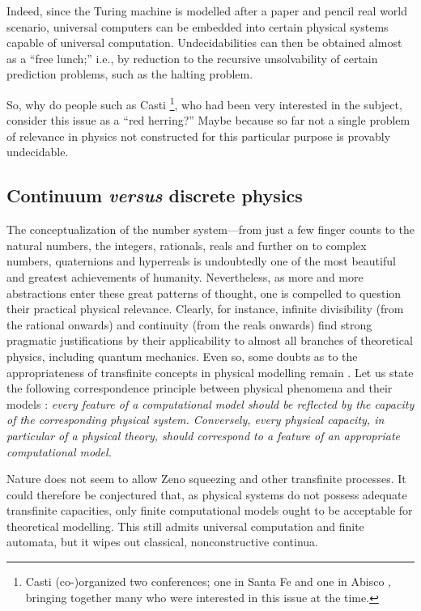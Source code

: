 \documentclass[pre,preprint,showpacs,showkeys,amsfonts]{revtex4}
\begin{document}
Indeed, since the Turing machine is modelled after a paper and pencil real world scenario,
universal computers can be embedded into certain physical
systems capable of universal computation.
Undecidabilities can then be obtained almost as a ``free lunch;''
i.e.,  by reduction to the recursive unsolvability
of certain prediction problems, such as the halting problem.

So, why do people such as Casti
\footnote{
Casti (co-)organized two conferences; one in Santa Fe \cite{casti:94-onlimits}
and one in Abisco  \cite{casti:96-onlimits},
bringing together many who were interested in this issue at the time.
}, who had  been very interested
in the subject, consider this issue as a ``red herring?''
Maybe because so far not a single problem of
relevance in physics not constructed for this particular purpose
is provably undecidable.

\subsection{Continuum {\it versus} discrete physics}

The conceptualization of the number
system---from just a few finger counts to the natural numbers,
the integers, rationals,
reals \cite{drobot} and further on to complex numbers, quaternions and hyperreals
is undoubtedly one of the most beautiful and greatest achievements of humanity.
Nevertheless, as more and more abstractions enter these great patterns of thought,
one is compelled to question
their practical physical relevance.
Clearly, for instance, infinite divisibility (from the rational onwards)
and continuity (from the reals onwards)
find strong pragmatic justifications by their
applicability to almost all branches of theoretical physics,
including quantum mechanics.
Even so,  some doubts as to the appropriateness
of transfinite concepts in physical modelling
remain \cite{bridgman}.
Let us state the following correspondence principle
between physical phenomena and their models \cite{svozil-set}:
{\em every feature of a computational model should be reflected by the
capacity of the corresponding physical system.
Conversely, every physical capacity, in particular of a physical theory,
should correspond to a feature of an appropriate
computational model.}

Nature does not seem to allow Zeno squeezing
\cite{weyl:49,gruenbaum:74,thom:54,benna:62,pit:90,hogarth1,ear-nor:93,svozil-93,sv-aut-rev}
and other transfinite processes.
It could therefore be conjectured that, as
physical systems do not possess adequate transfinite capacities,
only finite computational models ought to be acceptable for theoretical modelling.
This still admits  universal computation and finite automata,
but it wipes out classical, nonconstructive continua.
\end{document}
